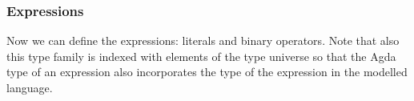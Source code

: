 \begin{comment}
Dependently typed languages with inductive types, like Agda, generally support inductive
type families. An inductive type family is a collection of inductive types given by
a common (generally $n$-ary) type constructor. Specific types from this family are then obtained
by saturating the type constructor with arguments of the appropriate types.

For example, the above type family given by the type constructor \ident{Op} is indexed
by three values of the type \ident{U}. By providing such specific values \ident{u}, \ident{v},
and \ident{w}, we instantiate the concrete type \ident{Op u v w} belonging to this type family.

Superficially, type families might resemble parameterized types, as found in other functional
languages such as Haskell or OCaml: in both cases, types are constructed by saturating a type
constructor.

\todo{Wouter Swierstra July 31, 2012 10:52 AM: This paragraph is a little vague. Inductive type families are very different from parameterized types (such as lists or trees). This isn't clear from the text as it stands. Perhaps explain a bit about how pattern matching works, or the difference between GADTs and regular data types. I'm sure some of the Agda tutorials have some text you can use to word this a bit more precisely. \cite[Sec.~2.6 and 3.1]{bove-dybjer}}

Some non-dependently typed languages, like Haskell, also provide a limited form of
type families, indexed only by types, not arbitrary values. For example, in Haskell,
``\ident{Expression Int}'' may represent a valid type (and it often does) but
``\ident{VectorOfLength 3}'' may not.%
\footnote{In Haskell, suitable type declarations allow expressions like \ident{S (S (S Z))}
to appear in type signatures. However, these expressions are proper \emph{types}, not values.}
\end{comment}

\subsubsection{Expressions}

Now we can define the expressions: literals and binary operators.
Note that also this type family is indexed with elements of the type universe
 so that the Agda type of an expression also incorporates the type of
the expression in the modelled language.

